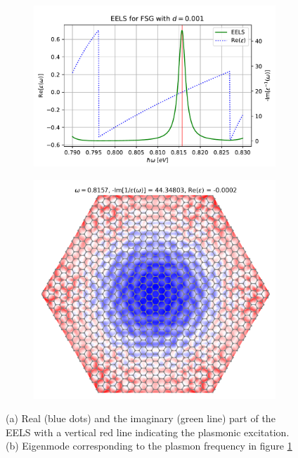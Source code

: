 \begin{figure}[H]
\centering
\begin{subfigure}[b]{.55\textwidth}
  \centering
  \includegraphics[width=\textwidth]{img/eels_FSG_059-061.pdf}
  \caption{}
  \label{fig:eels_fsg_s1}
\end{subfigure}
\hfill
\begin{subfigure}[b]{.44\textwidth}
  \centering
  \includegraphics[width=\textwidth]{img/mg_plasmons_0.8157.png}
  \caption{}
  \label{fig:eigenmode_fsg_s1}
\end{subfigure}
\caption{(a) Real (blue dots) and the imaginary (green line) part of the EELS with a vertical red line indicating the plasmonic excitation. (b) Eigenmode corresponding to the plasmon frequency in figure \ref{fig:eels_fsg_s1}}
\end{figure}



